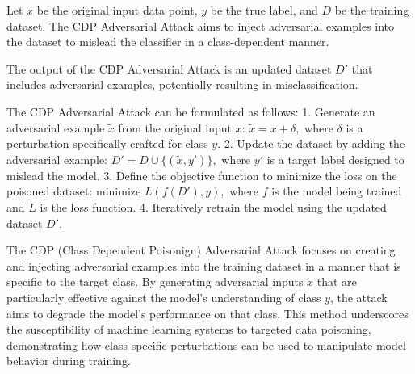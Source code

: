 Let \( x \) be the original input data point, \( y \) be the true label, and \( D \) be the training dataset. The CDP Adversarial Attack aims to inject adversarial examples into the dataset to mislead the classifier in a class-dependent manner.

The output of the CDP Adversarial Attack is an updated dataset \( D' \) that includes adversarial examples, potentially resulting in misclassification.

The CDP Adversarial Attack can be formulated as follows:
1. Generate an adversarial example \( \tilde{x} \) from the original input \( x \):
   $
   \tilde{x} = x + \delta,
   $
   where \( \delta \) is a perturbation specifically crafted for class \( y \).
2. Update the dataset by adding the adversarial example:
   $
   D' = D \cup \{(\tilde{x}, y')\},
   $
   where \( y' \) is a target label designed to mislead the model.
3. Define the objective function to minimize the loss on the poisoned dataset:
   $
   \text{minimize } L(f(D'), y),
   $
   where \( f \) is the model being trained and \( L \) is the loss function.
4. Iteratively retrain the model using the updated dataset \( D' \).

The CDP (Class Dependent Poisonign) Adversarial Attack focuses on creating and injecting adversarial examples into the training dataset in a manner that is specific to the target class. By generating adversarial inputs \( \tilde{x} \) that are particularly effective against the model's understanding of class \( y \), the attack aims to degrade the model's performance on that class. This method underscores the susceptibility of machine learning systems to targeted data poisoning, demonstrating how class-specific perturbations can be used to manipulate model behavior during training.

